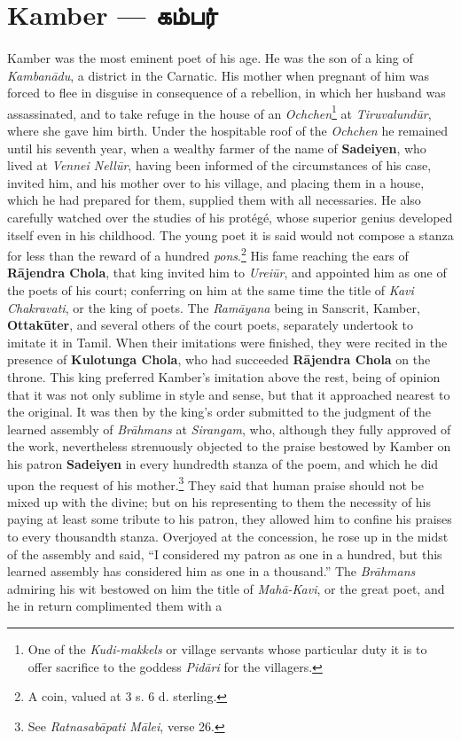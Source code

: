 \documentclass{article}
\newcommand{\TamilBold}[1]{\texttamil{\textbf{#1}}}
\newcommand{\tambold}[1]{\TamilBold{#1}}
\begin{document}
\section{Kamber --- \tambold{கம்பர்}}
\paragraph{}
Kamber was the most eminent poet of his age. He was the son of a king of \emph{Kamban\={a}du}, a district in the Carnatic. His mother when pregnant of him was forced to flee in disguise in consequence of a rebellion, in which her husband was assassinated, and to take refuge in the house of an \emph{Ochchen}\footnote{One of the \emph{Kudi-makkels} or village servants whose particular duty it is to offer sacrifice to the goddess \emph{Pid\={a}ri} for the villagers.} at \emph{Tiruvalund\={u}r}, where she gave him birth. Under the hospitable roof of the \emph{Ochchen} he remained until his seventh year, when a wealthy farmer of the name of \textbf{Sadeiyen}, who lived at \emph{Vennei Nell\={u}r}, having been informed of the circumstances of his case, invited him, and his mother over to his village, and placing them in a house, which he had prepared for them, supplied them with all necessaries. He also carefully watched over the studies of his protégé, whose superior genius developed itself even in his childhood. The young poet it is said would not compose a stanza for less than the reward of a hundred \emph{pons}.\footnote{A coin, valued at 3 s. 6 d. sterling.} His fame reaching the ears of \textbf{R\={a}jendra Chola}, that king invited him to \emph{Urei\={u}r}, and appointed him as one of the poets of his court; conferring on him at the same time the title of \emph{Kavi Chakravati}, or the king of poets. The \emph{Ram\={a}yana} being in Sanscrit, Kamber, \textbf{Ottak\={u}ter}, and several others of the court poets, separately undertook to imitate it in Tamil. When their imitations were finished, they were recited in the presence of \textbf{Kulotunga Chola}, who had succeeded \textbf{R\={a}jendra Chola} on the throne. This king preferred Kamber's imitation above the rest, being of opinion that it was not only sublime in style and sense, but that it approached nearest to the original. It was then by the king's order submitted to the judgment of the learned assembly of \emph{Br\={a}hmans} at \emph{Sirangam}, who, although they fully approved of the work, nevertheless strenuously objected to the praise bestowed by Kamber on his patron \textbf{Sadeiyen} in every hundredth stanza of the poem, and which he did upon the request of his mother.\footnote{See \emph{Ratnasab\={a}pati M\={a}lei}, verse 26.} They said that human praise should not be mixed up with the divine; but on his representing to them the necessity of his paying at least some tribute to his patron, they allowed him to confine his praises to every thousandth stanza. Overjoyed at the concession, he rose up in the midst of the assembly and said, ``I considered my patron as one in a hundred, but this learned assembly has considered him as one in a thousand.'' The \emph{Br\={a}hmans} admiring his wit bestowed on him the title of \emph{Mah\={a}-Kavi}, or the great poet, and he in return complimented them with a 
\end{document}

